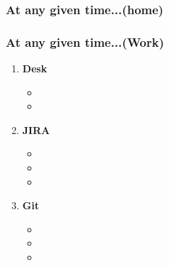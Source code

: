 \begin{frame}
\frametitle{At any given time...(home)}

\end{frame}

\begin{frame}
\frametitle{At any given time...(Work)}
\begin{enumerate}
\item \small \textbf{Desk}
\begin{itemize} 
\item \tiny 
\item \tiny
\end{itemize} 
\item \small \textbf{JIRA}
\begin{itemize} 
\item \tiny 
\item \tiny 
\item \tiny 
\end{itemize} 
\item \small \textbf{Git} 
\begin{itemize} 
\item \tiny 
\item \tiny 
\item \tiny 
\end{itemize} 
\end{enumerate} 
\end{frame}


